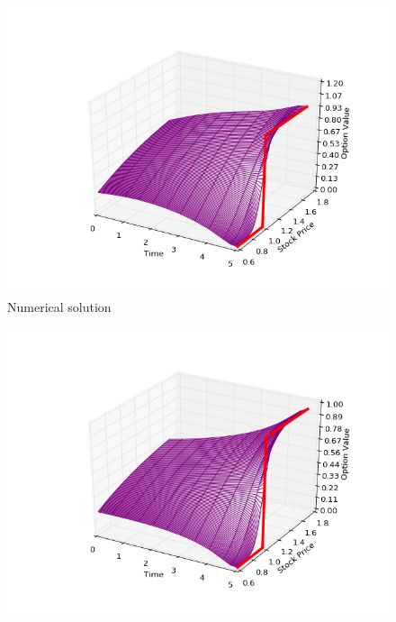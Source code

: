 \documentclass[11pt,a4paper]{extarticle}
\begin{document}
\begin{minipage}{\linewidth}
      \centering
      \begin{minipage}{0.29\linewidth}
          \begin{figure}[H]
              \includegraphics[width=\linewidth]{Figures/c-o-n-call-num}
              \caption{Numerical solution}
          \end{figure}
      \end{minipage}
      \hspace{0.04\linewidth}
      \begin{minipage}{0.29\linewidth}
          \begin{figure}[H]
              \includegraphics[width=\linewidth]{Figures/c-o-n-call-analyt}

\end{figure}
\end{minipage}
\end{minipage}
\end{document}
